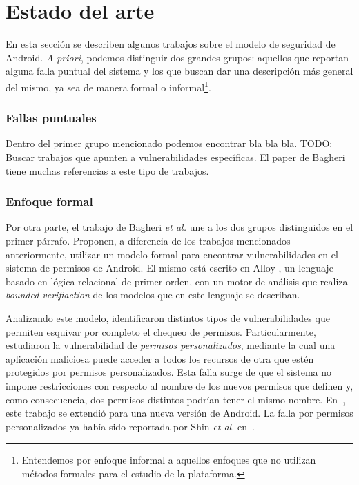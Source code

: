 
\chapter*{Estado del arte}
\label{chapter:estado}

En esta sección se describen algunos trabajos sobre el modelo de seguridad de
Android. \textit{A priori}, podemos distinguir dos grandes grupos: aquellos que
reportan alguna falla puntual del sistema y los que buscan dar una descripción
más general del mismo, ya sea de manera formal o informal\footnote{Entendemos
por enfoque informal a aquellos enfoques que no utilizan métodos formales para
el estudio de la plataforma.}.

\subsection*{Fallas puntuales}

Dentro del primer grupo mencionado podemos encontrar bla bla bla. TODO: Buscar
trabajos que apunten a vulnerabilidades específicas. El paper de Bagheri
\cite{bagheri} tiene muchas referencias a este tipo de trabajos.

\subsection*{Enfoque formal}

Por otra parte, el trabajo de Bagheri \textit{et al.} \cite{bagheri15} une a los
dos grupos distinguidos en el primer párrafo. Proponen, a diferencia de los trabajos
mencionados anteriormente, utilizar un modelo formal para encontrar
vulnerabilidades en el sistema de permisos de Android. El mismo está escrito en
Alloy \cite{alloy}, un lenguaje basado en lógica relacional de primer orden, con
un motor de análisis que realiza \textit{bounded verifiaction} de los
%
%
modelos que en este lenguaje se describan.

Analizando este modelo, identificaron distintos tipos de vulnerabilidades que
permiten esquivar por completo el chequeo de permisos. Particularmente,
estudiaron la vulnerabilidad
%
%
de \textit{permisos personalizados}, mediante la cual una aplicación maliciosa
puede acceder a todos los recursos de otra que estén protegidos por permisos
personalizados. Esta falla surge de que el sistema no impone restricciones con
respecto al nombre de los nuevos permisos que definen y, como consecuencia, dos
permisos distintos podrían tener el mismo nombre. En~\cite{bagheri}, este trabajo
se extendió para una nueva versión de Android. La falla por permisos personalizados
ya había sido reportada por Shin \textit{et al.} en~\cite{shin-custom}.

